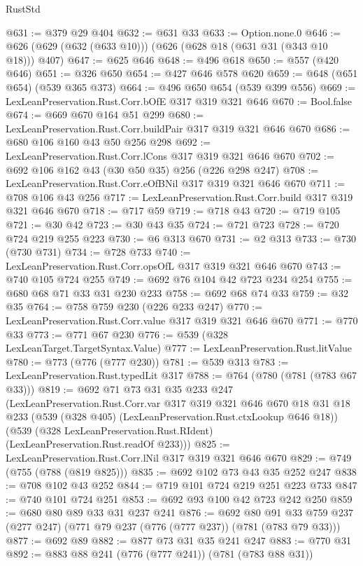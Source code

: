 \begin{lexlean}{RustStd}
\begin{coremodule}
@631 := @379 @29 @404
@632 := @631 @33
@633 := Option.none.{0}
@646 := @626 (@629 (@632 (@633 @10))) (@626 (@628 @18 (@631 @31 (@343 @10 @18))) @407)
@647 := @625 @646
@648 := @496 @618
@650 := @557 (@420 @646)
@651 := @326 @650
@654 := @427 @646 @578 @620
@659 := @648 (@651 @654) (@539 @365 @373)
@664 := @496 @650 @654 (@539 @399 @556)
@669 := LexLeanPreservation.Rust.Corr.bOfE @317 @319 @321 @646
@670 := Bool.false
@674 := @669 @670 @164 @51 @299
@680 := LexLeanPreservation.Rust.Corr.buildPair @317 @319 @321 @646 @670
@686 := @680 @106 @160 @43 @50 @256 @298
@692 := LexLeanPreservation.Rust.Corr.lCons @317 @319 @321 @646 @670
@702 := @692 @106 @162 @43 (@30 @50 @35) @256 (@226 @298 @247)
@708 := LexLeanPreservation.Rust.Corr.eOfBNil @317 @319 @321 @646 @670
@711 := @708 @106 @43 @256
@717 := LexLeanPreservation.Rust.Corr.build @317 @319 @321 @646 @670
@718 := @717 @59
@719 := @718 @43
@720 := @719 @105
@721 := @30 @42
@723 := @30 @43 @35
@724 := @721 @723
@728 := @720 @724 @219 @255 @223
@730 := @6 @313 @670
@731 := @2 @313
@733 := @730 (@730 @731)
@734 := @728 @733
@740 := LexLeanPreservation.Rust.Corr.opsOfL @317 @319 @321 @646 @670
@743 := @740 @105 @724 @255
@749 := @692 @76 @104 @42 @723 @234 @254
@755 := @680 @68 @71 @33 @31 @230 @233
@758 := @692 @68 @74 @33
@759 := @32 @35
@764 := @758 @759 @230 (@226 @233 @247)
@770 := LexLeanPreservation.Rust.Corr.value @317 @319 @321 @646 @670
@771 := @770 @33
@773 := @771 @67 @230
@776 := @539 (@328 LexLeanTarget.TargetSyntax.Value)
@777 := LexLeanPreservation.Rust.litValue
@780 := @773 (@776 (@777 @230))
@781 := @539 @313
@783 := LexLeanPreservation.Rust.typedLit @317
@788 := @764 (@780 (@781 (@783 @67 @33)))
@819 := @692
    @71
    @73
    @31
    @35
    @233
    @247
    (LexLeanPreservation.Rust.Corr.var
      @317
      @319
      @321
      @646
      @670
      @18
      @31
      @18
      @233
      (@539 (@328 @405) (LexLeanPreservation.Rust.ctxLookup @646 @18))
      (@539 (@328 LexLeanPreservation.Rust.RIdent) (LexLeanPreservation.Rust.readOf @233)))
@825 := LexLeanPreservation.Rust.Corr.lNil @317 @319 @321 @646 @670
@829 := @749 (@755 (@788 (@819 @825)))
@835 := @692 @102 @73 @43 @35 @252 @247
@838 := @708 @102 @43 @252
@844 := @719 @101 @724 @219 @251 @223 @733
@847 := @740 @101 @724 @251
@853 := @692 @93 @100 @42 @723 @242 @250
@859 := @680 @80 @89 @33 @31 @237 @241
@876 := @692
    @80
    @91
    @33
    @759
    @237
    (@277 @247)
    (@771 @79 @237 (@776 (@777 @237)) (@781 (@783 @79 @33)))
@877 := @692 @89
@882 := @877 @73 @31 @35 @241 @247
@883 := @770 @31
@892 := @883 @88 @241 (@776 (@777 @241)) (@781 (@783 @88 @31))

\end{coremodule}
\end{lexlean}
